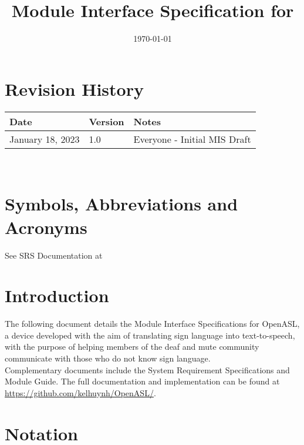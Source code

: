 \documentclass[12pt, titlepage]{article}
\begin{document}
\title{Module Interface Specification for \progname{}} 
\author{\authname}
\date{\today}

\maketitle


\section{Revision History}

\begin{tabularx}{\textwidth}{p{3cm}p{2cm}X}
\toprule {\bf Date} & {\bf Version} & {\bf Notes}\\
\midrule
January 18, 2023 & 1.0 & Everyone - Initial MIS Draft\\
\bottomrule
\end{tabularx}

~\newpage

\section{Symbols, Abbreviations and Acronyms}

See SRS Documentation at 


\newpage

\tableofcontents

\newpage


\section{Introduction}

The following document details the Module Interface Specifications for
OpenASL, a device developed with the aim of translating sign language into text-to-speech, 
with the purpose of helping members of the deaf and mute community communicate with those 
who do not know sign language.\\

Complementary documents include the System Requirement Specifications
and Module Guide.  The full documentation and implementation can be
found at \url{https://github.com/kelhuynh/OpenASL/}.\\

\section{Notation}
\end{document}
